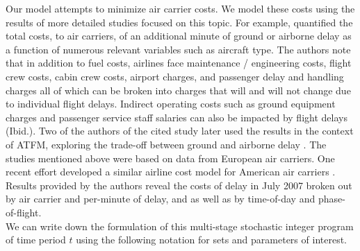 \documentclass[12pt]{article}
\begin{document}
	\newline %
	Our model attempts to minimize air carrier costs.  We model these costs using the results of more detailed studies focused on this topic.  For example, \cite{true_costs} quantified the total costs, to air carriers, of an additional minute of ground or airborne delay as a function of numerous relevant variables such as aircraft type.  The authors note that in addition to fuel costs, airlines face maintenance / engineering costs, flight crew costs, cabin crew costs, airport charges, and passenger delay and handling charges all of which can be broken into charges that will and will not change due to individual flight delays.  Indirect operating costs such as ground equipment charges and passenger service staff salaries can also be impacted by flight delays (Ibid.).  Two of the authors of the cited study later used the results in the context of ATFM, exploring the trade-off between ground and airborne delay \cite{cook}.  The studies mentioned above were based on data from European air carriers.  One recent effort developed a similar airline cost model for American air carriers \cite{ferguson}.  Results provided by the authors reveal the costs of delay in July 2007 broken out by air carrier and per-minute of delay, and as well as by time-of-day and phase-of-flight.\\
	\newline We can write down the formulation of this multi-stage stochastic integer program of time period \(t\) using the following notation for sets and parameters of interest.
\end{document}
